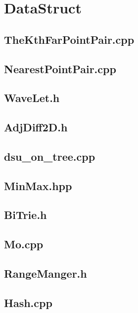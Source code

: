 \section{DataStruct}
\subsection{TheKthFarPointPair.cpp}

\subsection{NearestPointPair.cpp}

\subsection{WaveLet.h}

\subsection{AdjDiff2D.h}

\subsection{dsu\_on\_tree.cpp}

\subsection{MinMax.hpp}

\subsection{BiTrie.h}

\subsection{Mo.cpp}

\subsection{RangeManger.h}

\subsection{Hash.cpp}

